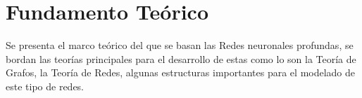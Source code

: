 \section{Fundamento Teórico}

Se presenta el marco teórico del que se basan las Redes neuronales profundas, se bordan las teorías principales para el desarrollo de estas como lo son la Teoría de Grafos, la Teoría de Redes, algunas estructuras importantes para el modelado de este tipo de redes.




